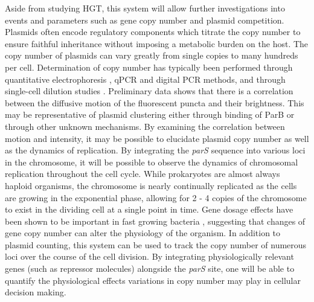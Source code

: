 Aside from studying HGT, this system will allow further investigations into
events and parameters such as gene copy number and plasmid competition.
Plasmids often encode regulatory components which titrate the copy number to
ensure faithful inheritance without imposing a metabolic burden on the host. The
copy number of plasmids can vary greatly from single copies to many hundreds per
cell.  Determination of copy number has typically been performed through
quantitative electrophoresis \cite{Schmidt:1996wk}, qPCR and digital PCR
methods, and through single-cell dilution studies \cite{BrewsterDilution}.
Preliminary data shows that there is a correlation between the diffusive motion
of the fluorescent puncta and their brightness. This may be representative of
plasmid clustering either through binding of ParB or through other unknown
mechanisms. By examining the correlation between motion and intensity, it may be
possible to elucidate plasmid copy number as well as the dynamics of
replication. By integrating the \textit{parS} sequence into various loci in the
chromosome, it  will be possible to observe the dynamics of chromosomal
replication throughout the cell cycle. While prokaryotes are  almost always
haploid organisms, the chromosome is nearly continually replicated as the cells
are growing in the exponential phase, allowing for 2 - 4 copies of the
chromosome to exist in the dividing cell at a single point in time. Gene dosage
effects have been shown to be important in fast growing bacteria
\cite{Couturier:2006hm}, suggesting that changes of gene copy number can alter
the physiology of the organism. In addition to plasmid counting, this system can
be used to track the copy number of numerous loci over the course of the cell
division. By integrating physiologically relevant genes (such as repressor
molecules) alongside the \textit{parS} site, one will be able to quantify the
physiological effects variations in copy number may play in cellular decision
making.


